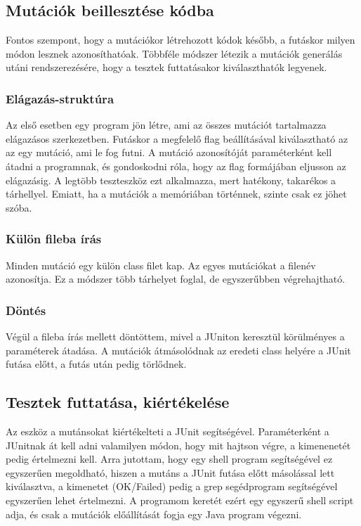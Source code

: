 \subsection{Mutációk beillesztése kódba}
Fontos szempont, hogy a mutációkor létrehozott kódok később, a futáskor milyen módon lesznek azonosíthatóak. Többféle módszer létezik a mutációk generálás utáni rendszerezésére, hogy a tesztek futtatásakor kiválaszthatók legyenek.
\subsubsection{Elágazás-struktúra}
Az első esetben egy program jön létre, ami az összes mutációt tartalmazza elágazásos szerkezetben. Futáskor a megfelelő flag beállításával kiválasztható az az egy mutáció, ami le fog futni. A mutáció azonosítóját paraméterként kell átadni a programnak, és gondoskodni róla, hogy az flag formájában eljusson az elágazásig. A legtöbb teszteszköz ezt alkalmazza, mert hatékony, takarékos a tárhellyel. Emiatt, ha a mutációk a memóriában történnek, szinte csak ez jöhet szóba.
\subsubsection{Külön fileba írás}
Minden mutáció egy külön class filet kap. Az egyes mutációkat a filenév azonosítja. Ez a módszer több tárhelyet foglal, de egyszerűbben végrehajtható.
\subsubsection{Döntés}
Végül a fileba írás mellett döntöttem, mivel a JUniton keresztül körülményes a paraméterek átadása. A mutációk átmásolódnak az eredeti class helyére a JUnit futása előtt, a futás után pedig törlődnek.
\subsection{Tesztek futtatása, kiértékelése}
Az eszköz a mutánsokat kiértékelteti a JUnit segítségével. Paraméterként a JUnitnak át kell adni valamilyen módon, hogy mit hajtson végre, a kimenenetét pedig értelmezni kell. Arra jutottam, hogy egy shell program segítségével ez egyszerűen megoldható, hiszen a mutáns a JUnit futása előtt másolással lett kiválasztva, a kimenetet (OK/Failed) pedig a grep segédprogram segítségével egyszerűen lehet értelmezni. A programom keretét ezért egy egyszerű shell script adja, és csak a mutációk előállítását fogja egy Java program végezni.
